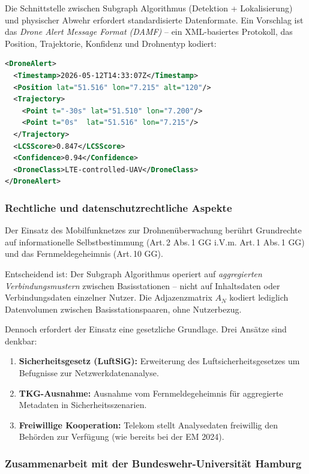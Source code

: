 ﻿\documentclass[a4paper,12pt]{article}
\theoremstyle{definition}
\begin{document}
Die Schnittstelle zwischen Subgraph Algorithmus (Detektion + Lokalisierung)
und physischer Abwehr erfordert standardisierte Datenformate. Ein Vorschlag
ist das \emph{Drone Alert Message Format (DAMF)} -- ein XML-basiertes
Protokoll, das Position, Trajektorie, Konfidenz und Drohnentyp kodiert:

\begin{lstlisting}[language=XML, caption={Vorgeschlagenes DAMF-Datenformat}]
<DroneAlert>
  <Timestamp>2026-05-12T14:33:07Z</Timestamp>
  <Position lat="51.516" lon="7.215" alt="120"/>
  <Trajectory>
    <Point t="-30s" lat="51.510" lon="7.200"/>
    <Point t="0s"  lat="51.516" lon="7.215"/>
  </Trajectory>
  <LCSScore>0.847</LCSScore>
  <Confidence>0.94</Confidence>
  <DroneClass>LTE-controlled-UAV</DroneClass>
</DroneAlert>
\end{lstlisting}

\subsubsection{Rechtliche und datenschutzrechtliche Aspekte}

Der Einsatz des Mobilfunknetzes zur Drohnen\"uberwachung ber\"uhrt
Grundrechte auf informationelle Selbstbestimmung (Art.\,2 Abs.\,1 GG
i.V.m. Art.\,1 Abs.\,1 GG) und das Fernmeldegeheimnis (Art.\,10 GG).

Entscheidend ist: Der Subgraph Algorithmus operiert auf \emph{aggregierten
Verbindungsmustern} zwischen Basisstationen -- nicht auf Inhaltsdaten oder
Verbindungsdaten einzelner Nutzer. Die Adjazenzmatrix $A_N$ kodiert
lediglich Datenvolumen zwischen Basisstationspaaren, ohne Nutzerbezug.

Dennoch erfordert der Einsatz eine gesetzliche Grundlage. Drei Ans\"atze
sind denkbar:
\begin{enumerate}
    \item \textbf{Sicherheitsgesetz (LuftSiG):} Erweiterung des
          Luftsicherheitsgesetzes um Befugnisse zur Netzwerkdatenanalyse.
    \item \textbf{TKG-Ausnahme:} Ausnahme vom Fernmeldegeheimnis f\"ur
          aggregierte Metadaten in Sicherheitsszenarien.
    \item \textbf{Freiwillige Kooperation:} Telekom stellt Analysedaten
          freiwillig den Beh\"orden zur Verf\"ugung (wie bereits bei der EM 2024).
\end{enumerate}

\subsubsection{Zusammenarbeit mit der Bundeswehr-Universit\"at Hamburg}
\end{document}
